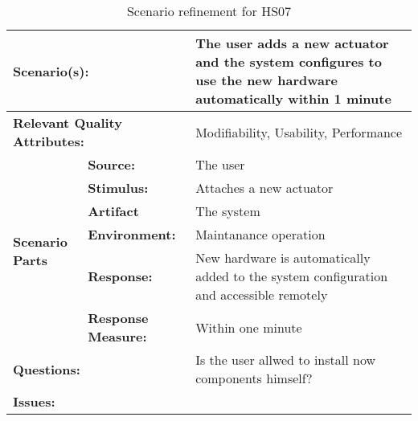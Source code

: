 \documentclass[10pt,a4paper]{article}
\begin{document}
\begin{table}[!htp]
\begin{center}
\begin{tabular}{|p{0.3cm}|p{2.5cm}|p{8cm}|}
  \hline
  \multicolumn{2}{|p{3cm}|}{\bfseries Scenario(s):} & The user adds a new actuator and the system configures to use the new hardware automatically within 1 minute \\
  \hline
  \multicolumn{2}{|p{3cm}|}{\bfseries Relevant Quality Attributes:} & Modifiability, Usability, Performance \\
  \hline
  \multirow{6}{*}{\begin{sideways}{\bfseries Scenario Parts}\end{sideways}}
  & {\bfseries Source:} & The user \\
  \cline{2-3}
  & {\bfseries Stimulus:} & Attaches a new actuator \\
  \cline{2-3}
  & {\bfseries Artifact} & The system \\
  \cline{2-3}
  & {\bfseries Environment:} & Maintanance operation \\
  \cline{2-3}
  & {\bfseries Response:} & New hardware is automatically added to the system configuration and accessible remotely \\
  \cline{2-3}
  & {\bfseries Response Measure:} & Within one minute \\
  \hline
  \multicolumn{2}{|p{3cm}|}{\bfseries Questions:} & Is the user allwed to install now components himself? \\
  \hline
  \multicolumn{2}{|p{3cm}|}{\bfseries Issues:} &  \\
  \hline
\end{tabular}
\caption{Scenario refinement for HS07}
\end{center}
\end{table}
\end{document}
